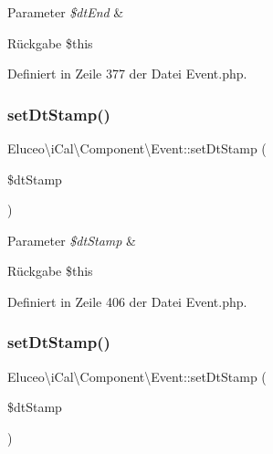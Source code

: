 \begin{DoxyParams}{Parameter}
{\em \$dt\+End} & \\
\hline
\end{DoxyParams}
\begin{DoxyReturn}{Rückgabe}
\$this 
\end{DoxyReturn}


Definiert in Zeile 377 der Datei Event.\+php.

\mbox{\label{class_eluceo_1_1i_cal_1_1_component_1_1_event_a395b6bc368752cb4f2dbe0fac3b4bc8f}} 
\subsubsection{\texorpdfstring{set\+Dt\+Stamp()}{setDtStamp()}\hspace{0.1cm}{\footnotesize\ttfamily [1/3]}}
{\footnotesize\ttfamily Eluceo\textbackslash{}i\+Cal\textbackslash{}\+Component\textbackslash{}\+Event\+::set\+Dt\+Stamp (\begin{DoxyParamCaption}\item[{}]{\$dt\+Stamp }\end{DoxyParamCaption})}


\begin{DoxyParams}{Parameter}
{\em \$dt\+Stamp} & \\
\hline
\end{DoxyParams}
\begin{DoxyReturn}{Rückgabe}
\$this 
\end{DoxyReturn}


Definiert in Zeile 406 der Datei Event.\+php.

\mbox{\label{class_eluceo_1_1i_cal_1_1_component_1_1_event_a395b6bc368752cb4f2dbe0fac3b4bc8f}} 
\subsubsection{\texorpdfstring{set\+Dt\+Stamp()}{setDtStamp()}\hspace{0.1cm}{\footnotesize\ttfamily [2/3]}}
{\footnotesize\ttfamily Eluceo\textbackslash{}i\+Cal\textbackslash{}\+Component\textbackslash{}\+Event\+::set\+Dt\+Stamp (\begin{DoxyParamCaption}\item[{}]{\$dt\+Stamp }\end{DoxyParamCaption})}


